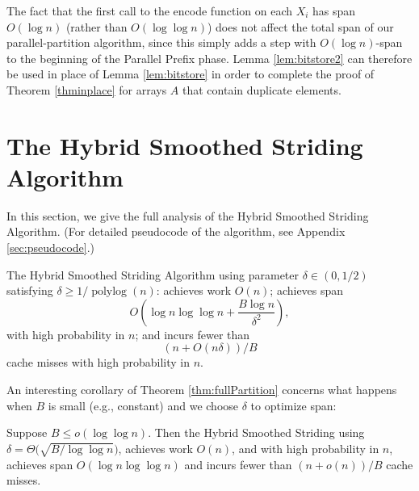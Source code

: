 \documentclass[a4paper,UKenglish,cleveref, autoref, thm-restate]{lipics-v2019}
\DeclareMathOperator{\polylog}{\text{polylog}}
\begin{document}
The fact that the first call to the encode function on each $X_i$ has
span $O(\log n)$ (rather than $O(\log \log n)$) does not affect the
total span of our parallel-partition algorithm, since this simply adds
a step with $O(\log n)$-span to the beginning of the Parallel Prefix
phase. Lemma \ref{lem:bitstore2} can therefore be used in place of Lemma
\ref{lem:bitstore} in order to complete the proof of Theorem
\ref{thminplace} for arrays $A$ that contain duplicate elements.

\section{The Hybrid Smoothed Striding Algorithm}\label{sec:hybridSmoothedStridingfull}

In this section, we give the full analysis of the Hybrid Smoothed
Striding Algorithm. (For detailed pseudocode of the algorithm, see Appendix
\ref{sec:pseudocode}.)

\begin{theorem}
  \label{thm:fullPartition} The Hybrid Smoothed Striding
  Algorithm using parameter $\delta\in(0,1/2)$ satisfying $\delta
  \ge 1/\polylog(n)$: achieves work $O(n)$; achieves span
  $$O\left(\log n \log\log n +\frac{B\log n}{\delta^2}\right),$$ with
  high probability in $n$; and incurs fewer than
  $$(n+O(n\delta))/B$$ cache misses with high probability in $n$.
\end{theorem}


An interesting corollary of Theorem \ref{thm:fullPartition}
concerns what happens when $B$ is small (e.g., constant) and we
choose $\delta$ to optimize span:

\begin{corollary}
  \label{cor:fullPartition}
Suppose $B \le o(\log \log n)$. Then the Hybrid Smoothed Striding
using $\delta = \Theta\big(\sqrt{B/\log\log n}\big)$, achieves
work $O(n)$, and with high probability in $n$, achieves span
$O(\log n \log\log n)$ and incurs fewer than $(n+o(n))/B$ cache misses.
\end{corollary}
\end{document}
